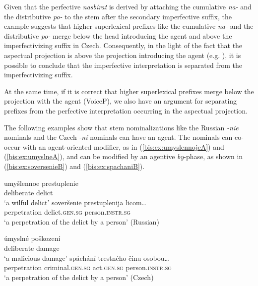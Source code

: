 \documentclass[output=paper]{langscibook}
\begin{document}
\z
\z

\noindent Given that the perfective \textit{nasbírat} is derived by attaching the cumulative \textit{na-} and the distributive \textit{po-} to the stem after the secondary imperfective suffix, the example suggests that higher superlexical prefixes like the cumulative \textit{na-} and the distributive \textit{po-} merge below the head introducing the agent and above the imperfectivizing suffix in Czech. Consequently, in the light of the fact that the aspectual projection is above the projection introducing the agent (e.g. \citealt{Babko-Malaya2003,Filip2005,Blaszczak.Klimek-Jankowska2012,Gribanova2015}), it is possible to conclude that the imperfective interpretation is separated from the imperfectivizing suffix.

At the same time, if it is correct that higher superlexical prefixes merge below the projection with the agent (VoiceP), we also have an argument for separating prefixes from the perfective interpretation occurring in the aspectual projection.

The following examples show that stem nominalizations like the Russian \textit{-nie} nominals and the Czech \textit{-ní} nominals can have an agent. The nominals can co-occur with an agent-oriented modifier, as in (\ref{bis:ex:umyslennojeA}) and (\ref{bis:ex:umyslneA}), and can be modified by an agentive \textit{by}-phase, as shown in (\ref{bis:ex:soversenieB}) and (\ref{bis:ex:spachaniB}). 

\ea\label{bis:ex:umyslennoje}
\ea\label{bis:ex:umyslennojeA}
\gll 
umyšlennoe	prestuplenie \\
deliberate		delict \\
\glt ‘a wilful delict’ 
\ex\label{bis:ex:soversenieB}
\gll 
soveršenie   		prestuplenija 	licom… \\
perpetration		delict.\textsc{gen.sg} person.\textsc{instr.sg} \\
\glt ‘a perpetration of the delict by a person’	
\hfill (Russian)
\z
\z

\ea\label{bis:ex:umyslne}
\ea\label{bis:ex:umyslneA}
\gll 
úmyslné		poškození \\
deliberate	damage \\
\glt ‘a malicious damage’ 
\ex\label{bis:ex:spachaniB}
\gll 
spáchání   			trestného 				činu 				osobou… \\
perpetration		criminal.\textsc{gen.sg} act.\textsc{gen.sg} person.\textsc{instr.sg} \\
\glt ‘a perpetration of the delict by a person’	
\hfill (Czech)
\z
\z
\end{document}

